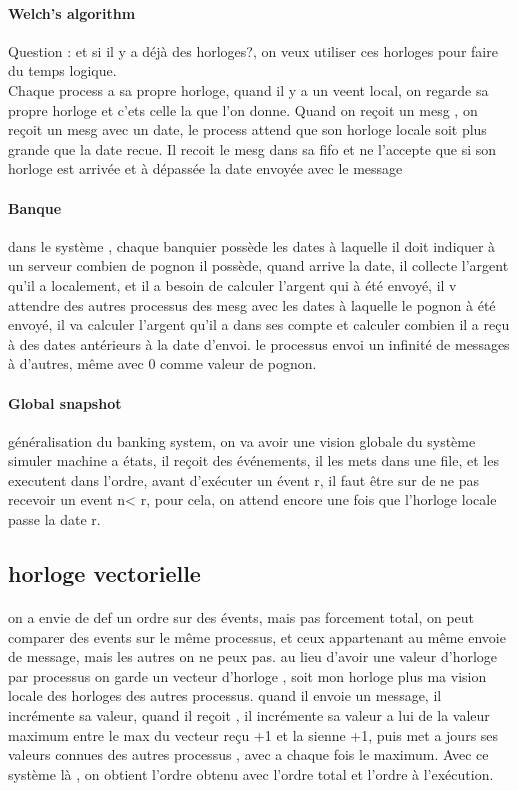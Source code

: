 \documentclass{article}
\begin{document}
\paragraph{Welch's algorithm} Question : et si il y a déjà des horloges?, on veux utiliser ces horloges pour faire du temps logique.\\Chaque process a sa propre horloge, quand il y a un veent local, on regarde sa propre horloge et c'ets celle la que l'on donne. Quand on reçoit un mesg , on reçoit un mesg avec un date, le process attend que son horloge locale soit plus grande que la date recue. Il recoit le mesg dans sa fifo et ne l'accepte que si son horloge est arrivée et à dépassée la date envoyée avec le message

\paragraph{Banque} dans le système , chaque banquier possède les dates à laquelle il doit indiquer à un serveur combien de pognon il possède, quand arrive la date, il collecte l'argent qu'il a localement, et il a  besoin de calculer l'argent qui à été envoyé, il v attendre des autres processus des mesg avec les dates à laquelle le pognon à été envoyé, il va calculer l'argent qu'il a dans ses compte et calculer combien il a reçu à des dates antérieurs à la date d'envoi. le processus envoi un infinité de messages à d'autres, même avec 0 comme valeur de pognon.

\paragraph{Global snapshot} généralisation du banking system, on va avoir une vision globale du système\\ simuler machine a états, il reçoit des événements, il les mets dans une file, et les executent dans l'ordre, avant d'exécuter un évent r, il faut être sur de ne pas recevoir un event  n< r, pour cela, on attend encore une fois que l'horloge locale passe la date r.
\subsection{horloge vectorielle} 
\paragraph{} on a envie de def un ordre sur des évents, mais pas forcement total, on peut comparer des events sur le même processus, et ceux appartenant au même envoie de message, mais les autres on ne peux pas. au lieu d'avoir une valeur d'horloge par processus on garde un vecteur d'horloge , soit mon horloge plus ma vision locale des horloges des autres processus. quand il envoie un message, il incrémente sa valeur, quand il reçoit , il incrémente sa valeur a lui de la valeur maximum entre le max du vecteur reçu +1 et la sienne +1, puis met a jours ses valeurs connues des autres processus , avec a chaque fois le maximum. Avec ce système là , on obtient l'ordre obtenu avec l'ordre total et l'ordre à l’exécution.
\end{document}
